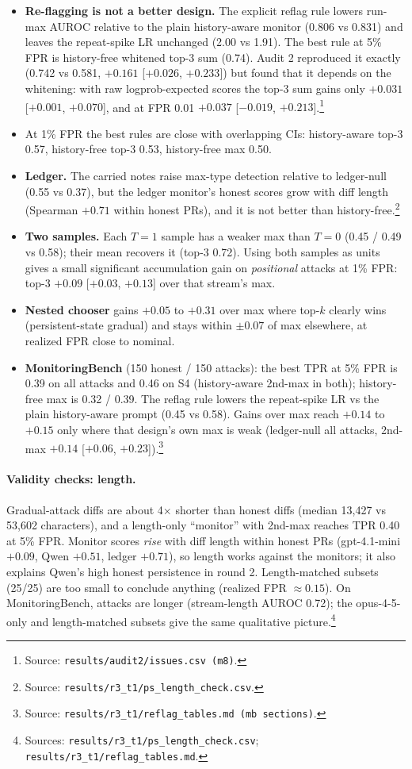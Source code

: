 \documentclass[11pt]{article}
\newcommand{\m}{\ensuremath{-}}
\newcommand{\src}[1]{\footnote{Source: \nolinkurl{#1}.}}
\newcommand{\srcs}[2]{\footnote{Sources: \nolinkurl{#1}; \nolinkurl{#2}.}}
\begin{document}
\begin{itemize}
\item \textbf{Re-flagging is not a better design.} The explicit reflag rule lowers run-max AUROC relative to the plain history-aware monitor (0.806 vs 0.831) and leaves the repeat-spike LR unchanged (2.00 vs 1.91). The best rule at 5\% FPR is history-free whitened top-3 sum (0.74). Audit 2 reproduced it exactly (0.742 vs 0.581, $+0.161$ [$+0.026$, $+0.233$]) but found that it depends on the whitening: with raw logprob-expected scores the top-3 sum gains only $+0.031$ [$+0.001$, $+0.070$], and at FPR 0.01 $+0.037$ [$\m0.019$, $+0.213$].\src{results/audit2/issues.csv (m8)}
\item At 1\% FPR the best rules are close with overlapping CIs: history-aware top-3 0.57, history-free top-3 0.53, history-free max 0.50.
\item \textbf{Ledger.} The carried notes raise max-type detection relative to ledger-null (0.55 vs 0.37), but the ledger monitor's honest scores grow with diff length (Spearman $+0.71$ within honest PRs), and it is not better than history-free.\src{results/r3_t1/ps_length_check.csv}
\item \textbf{Two samples.} Each $T{=}1$ sample has a weaker max than $T{=}0$ (0.45 / 0.49 vs 0.58); their mean recovers it (top-3 0.72). Using both samples as units gives a small significant accumulation gain on \emph{positional} attacks at 1\% FPR: top-3 $+0.09$ [$+0.03$, $+0.13$] over that stream's max.
\item \textbf{Nested chooser} gains $+0.05$ to $+0.31$ over max where top-$k$ clearly wins (persistent-state gradual) and stays within $\pm0.07$ of max elsewhere, at realized FPR close to nominal.
\item \textbf{MonitoringBench} (150 honest / 150 attacks): the best TPR at 5\% FPR is 0.39 on all attacks and 0.46 on S4 (history-aware 2nd-max in both); history-free max is 0.32 / 0.39. The reflag rule lowers the repeat-spike LR vs the plain history-aware prompt (0.45 vs 0.58). Gains over max reach $+0.14$ to $+0.15$ only where that design's own max is weak (ledger-null all attacks, 2nd-max $+0.14$ [$+0.06$, $+0.23$]).\src{results/r3_t1/reflag_tables.md (mb sections)}
\end{itemize}

\paragraph{Validity checks: length.} Gradual-attack diffs are about 4$\times$ shorter than honest diffs (median 13{,}427 vs 53{,}602 characters), and a length-only ``monitor'' with 2nd-max reaches TPR 0.40 at 5\% FPR. Monitor scores \emph{rise} with diff length within honest PRs (gpt-4.1-mini $+0.09$, Qwen $+0.51$, ledger $+0.71$), so length works against the monitors; it also explains Qwen's high honest persistence in round 2. Length-matched subsets (25/25) are too small to conclude anything (realized FPR $\approx0.15$). On MonitoringBench, attacks are longer (stream-length AUROC 0.72); the opus-4-5-only and length-matched subsets give the same qualitative picture.\srcs{results/r3_t1/ps_length_check.csv}{results/r3_t1/reflag_tables.md}
\end{document}
